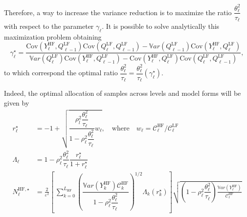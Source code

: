 Therefore, a way to increase the variance reduction is to maximize the ratio $\dfrac{\theta_\ell^2}{\tau_\ell}$ with respect to the 
parameter $\gamma_\ell$. It is possible to solve analytically this maximization problem obtaining 
\begin{equation}
\gamma_\ell^\star= \dfrac{ \mathrm{Cov}\left(  Y^{\mathrm{HF}}_{\ell},Q_{\ell-1}^{\mathrm{LF}} \right) \mathrm{Cov}\left( Q_{\ell}^{\mathrm{LF}},Q_{\ell-1}^{\mathrm{LF}} \right) 
                   - \mathbb{V}ar\left(Q_{\ell-1}^{\mathrm{LF}}\right) \mathrm{Cov}\left(  Y^{\mathrm{HF}}_{\ell},Q_{\ell}^{\mathrm{LF}} \right) }
            { \mathbb{V}ar\left(Q_{\ell}^{\mathrm{LF}}\right) \mathrm{Cov}\left( Y^{\mathrm{HF}}_{\ell},Q_{\ell-1}^{\mathrm{LF}} \right) 
            - \mathrm{Cov}\left( Y^{\mathrm{HF}}_{\ell},Q_{\ell}^{\mathrm{LF}} \right) \mathrm{Cov}\left( Q_{\ell}^{\mathrm{LF}},Q_{\ell-1}^{\mathrm{LF}} \right) },
\end{equation}
to which correspond the optimal ratio $\dfrac{\theta_\ell^2}{\tau_\ell} = \dfrac{\theta_\ell^2}{\tau_\ell} (\gamma_\ell^\star )$.

Indeed, the optimal allocation of samples across levels and model forms will be given by
 \begin{equation*}
 \begin{split}
  r_\ell^{\star} &= -1 + \sqrt{ \dfrac{\rho_l^2 \dfrac{\theta_\ell^2}{\tau_\ell} }{1-\rho_\ell^2 \dfrac{\theta_\ell^2}{\tau_\ell}} w_{\ell}}, \quad \mathrm{where} \quad w_{\ell} 
               =  \mathcal{C}_{\ell}^{\mathrm{HF}} / \mathcal{C}_{\ell}^{\mathrm{LF}}\\
  \Lambda_{\ell} &= 1 - \rho_\ell^2 \dfrac{\theta_\ell^2}{\tau_\ell} \dfrac{r_\ell^{\star}}{1+r_\ell^{\star}}\\
  N_{\ell}^{\mathrm{HF},\star} &= \frac{2}{\varepsilon^2} \!\! \left[ \, \sum_{k=0}^{ L_{\mathrm{HF}} } 
       \left( \dfrac{ \mathbb{V}ar\left(Y_k^{ \mathrm{HF} } \right) \mathcal{C}_{k}^{\mathrm{HF}}}{1-\rho_\ell^2 \dfrac{\theta_\ell^2}{\tau_\ell}} \right)^{1/2} \Lambda_{k}(r_k^{\star})\right] 
               \sqrt{ \left( 1 - \rho_\ell^2 \dfrac{\theta_\ell^2}{\tau_\ell} \right) \frac{ \mathbb{V}ar\left( Y^{\mathrm{HF}}_{\ell} \right) }{\mathcal{C}_{\ell}^{\mathrm{HF}}}}
 \end{split}
\end{equation*}

